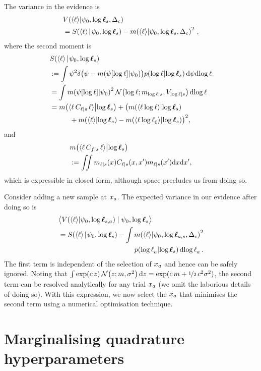 \documentclass{article}
\begin{document}
The variance in the evidence is
\begin{align*}
& \cov{\inty{\lfn}}{\psi_0,\tvr_s,\Delta_c}\\ 
& = \secm{\inty{\lfn}}{\psi_0,\tvr_s} - \mean{\inty{\lfn}}{\psi_0,\tvr_s,\Delta_c}^2\,,
\end{align*}
where the second moment is 
\begin{align*}
& \secm{\inty{\lfn}}{\psi_0,\tvr_s}  \\
& \deq \int \psi^2 
\delta\bigl(\psi - \mean{\psi[\tr]}{\psi_0}\bigr)
\p{\tr}{\tvr_s}
\ud\psi \ud\tr\\
& = \int \mean{\psi[\tr]}{\psi_0}^2
\N{\tr}{\meancondfn{\tr}{s}}{\covcondfn{\tr}{s}}
 \ud\tr\\
& = \mean{\inty{\lfn\,C_{\lfn|s}\,\lfn}}{\tvr_s}+
\bigl(\mean{\inty{\lfn\, \tr}}{\tvr_s}
 \\
& \hspace{1cm} + 
\mean{\inty{\lfn}}{\tvr_s} - \mean{\inty{\lfn\, \tr_0}}{\tvr_s}\bigr)^2,
\end{align*}
and
\begin{align*}
  &\mean{\inty{\lfn\,C_{f|s}\,\lfn}}{\tvr_s} \\ &\deq
 \iint m_{\lfn|s}(\lfv) C_{\lfn|s}(\lfv,\lfv') m_{\lfn|s}(\lfv') \ud \lfv \ud\lfv',
\end{align*}
which is expressible in closed form, although space precludes us from doing so.

Consider adding a new sample at $\lfv_a$. The expected variance in our evidence after doing so is
\begin{align}
&\bigl\langle \cov{\inty{\lfn}}{\psi_0,\tvr_{s,a}}\mid \psi_0,\tvr_{s}\bigr\rangle 
\nonumber\\
& = \secm{\inty{\lfn}}{\psi_0,\tvr_s} 
- \int\mean{\inty{\lfn}}{\psi_0,\tvr_{a,s},\Delta_c}^2\nonumber\\
& \hspace{3.8cm} \p{\tr_a}{\tvr_s}\ud\tr_a\,.\label{eqn:exp_var}
\end{align}
The first term is independent of the selection of $\lfv_a$ and hence can be safely ignored. Noting that $\int \exp(c\, z)\, \N{z}{m}{\sigma^2} \ud z = \exp(c\, m + \nicefrac{1}{2}\, c^2 \sigma^2)$, the second term can be resolved analytically for any trial $\lfv_a$ (we omit the laborious details of doing so). With this expression, we now select the $\lfv_a$ that minimises the second term using a numerical optimisation technique. 

\section{Marginalising quadrature hyperparameters}
\end{document}
